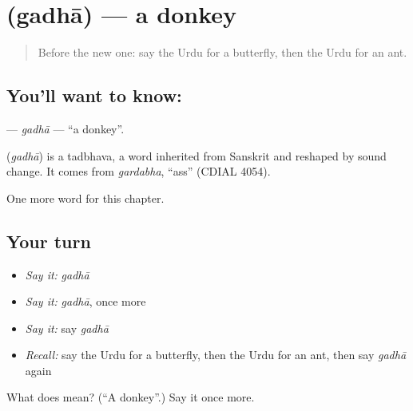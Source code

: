 \section[\texorpdfstring{\ur{گدھا} (gadhā)}{گدھا (gadhā)}]{ (gadhā) — a donkey}

\label{lesson:UR-C126-gadha}



\begin{quote}
Before the new one: say the Urdu for a butterfly, then the Urdu for an ant.
\end{quote}

\subsection*{You'll want to know: }
\textbf{} — \emph{gadhā} — \textquotedblleft{}a donkey\textquotedblright{}.

\begin{cousinweb}
\textbf{} (\emph{gadhā}) is a tadbhava, a word inherited from Sanskrit and reshaped by sound change. It comes from \emph{gardabha}, \textquotedblleft{}ass\textquotedblright{} (CDIAL 4054).
\end{cousinweb}

\begin{grammarlens}[title={What you've built}]
One more word for this chapter.
\end{grammarlens}

\subsection*{Your turn}
\begin{itemize}
\raggedright
  \item \emph{Say it:} \emph{gadhā}
  \item \emph{Say it:} \emph{gadhā}, once more
  \item \emph{Say it:} say \emph{gadhā}
  \item \emph{Recall:} say the Urdu for a butterfly, then the Urdu for an ant, then say \emph{gadhā} again
\end{itemize}

\begin{tcolorbox}[breakable,colback=teal!4,colframe=teal!35!black,title={Before you move on}]
What does  mean? (\textquotedblleft{}A donkey\textquotedblright{}.) Say it once more.
\end{tcolorbox}
